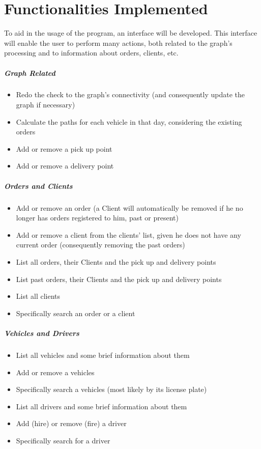 \chapter{Functionalities Implemented}

To aid in the usage of the program, an interface will be developed. This interface will enable the user to perform many actions, both related to the graph's processing and to information about orders, clients, etc.

\paragraph{Graph Related}
\begin{itemize}
    \item Redo the check to the graph's connectivity (and consequently update the graph if necessary)
    \item Calculate the paths for each vehicle in that day, considering the existing orders
    \item Add or remove a pick up point
    \item Add or remove a delivery point
\end{itemize}

\paragraph{Orders and Clients}
\begin{itemize}
    \item Add or remove an order (a Client will automatically be removed if he no longer has orders registered to him, past or present)
    \item Add or remove a client from the clients' list, given he does not have any current order (consequently removing the past orders)
    \item List all orders, their Clients and the pick up and delivery points
    \item List past orders, their Clients and the pick up and delivery points
    \item List all clients 
    \item Specifically search an order or a client
\end{itemize}

\paragraph{Vehicles and Drivers}
\begin{itemize}
    \item List all vehicles and some brief information about them
    \item Add or remove a vehicles
    \item Specifically search a vehicles (most likely by its license plate)
    \item List all drivers and some brief information about them
    \item Add (hire) or remove (fire) a driver
    \item Specifically search for a driver
\end{itemize}